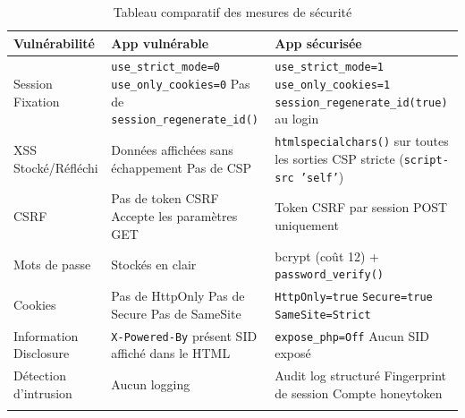 \documentclass[12pt,a4paper]{report}
\begin{document}
\begin{longtable}{@{}p{3.2cm}p{4.5cm}p{4.5cm}@{}}
\toprule
\textbf{Vulnérabilité} & \textbf{App vulnérable} & \textbf{App sécurisée} \\
\midrule
\endhead
Session Fixation &
  \texttt{use\_strict\_mode=0} \newline
  \texttt{use\_only\_cookies=0} \newline
  Pas de \texttt{session\_regenerate\_id()} &
  \texttt{use\_strict\_mode=1} \newline
  \texttt{use\_only\_cookies=1} \newline
  \texttt{session\_regenerate\_id(true)} au login \\[6pt]

XSS Stocké/Réfléchi &
  Données affichées sans échappement \newline
  Pas de CSP &
  \texttt{htmlspecialchars()} sur toutes les sorties \newline
  CSP stricte (\texttt{script-src 'self'}) \\[6pt]

CSRF &
  Pas de token CSRF \newline
  Accepte les paramètres GET &
  Token CSRF par session \newline
  POST uniquement \\[6pt]

Mots de passe &
  Stockés en clair &
  bcrypt (coût 12) + \texttt{password\_verify()} \\[6pt]

Cookies &
  Pas de HttpOnly \newline
  Pas de Secure \newline
  Pas de SameSite &
  \texttt{HttpOnly=true} \newline
  \texttt{Secure=true} \newline
  \texttt{SameSite=Strict} \\[6pt]

Information Disclosure &
  \texttt{X-Powered-By} présent \newline
  SID affiché dans le HTML &
  \texttt{expose\_php=Off} \newline
  Aucun SID exposé \\[6pt]

Détection d'intrusion &
  Aucun logging &
  Audit log structuré \newline
  Fingerprint de session \newline
  Compte honeytoken \\

\bottomrule
\caption{Tableau comparatif des mesures de sécurité}
\end{longtable}
\end{document}
